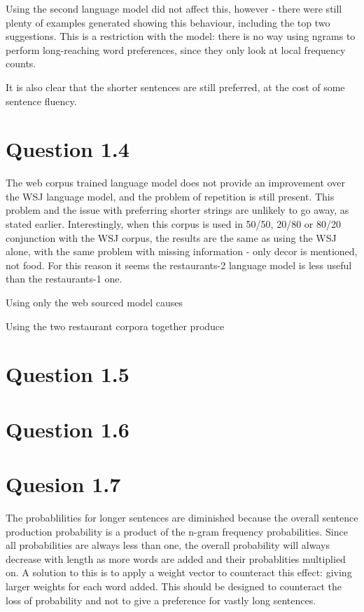 \documentclass[a4paper,11pt,oneside]{article}
\begin{document}
Using the second language model did not affect this, however - there were still plenty of examples generated showing this behaviour, including the top two suggestions. This is a restriction with the model: there is no way using ngrams to perform long-reaching word preferences, since they only look at local frequency counts.

It is also clear that the shorter sentences are still preferred, at the cost of some sentence fluency.

\section{Question 1.4}
The web corpus trained language model does not provide an improvement over the WSJ language model, and the problem of repetition is still present. This problem and the issue with preferring shorter strings are unlikely to go away, as stated earlier. Interestingly, when this corpus is used in 50/50, 20/80 or 80/20 conjunction with the WSJ corpus, the results are the same as using the WSJ alone, with the same problem with missing information - only decor is mentioned, not food. For this reason it seems the restaurants-2 language model is less useful than the restaurants-1 one.

Using only the web sourced model causes

Using the two restaurant corpora together produce 

\section{Question 1.5}

\section{Question 1.6}

\section{Quesion 1.7}
The probablilities for longer sentences are diminished because the overall sentence production probability is a product of the n-gram frequency probabilities. Since all probabilities are always less than one, the overall probability will always decrease with length as more words are added and their probablities multiplied on. A solution to this is to apply a weight vector to counteract this effect: giving larger weights for each word added. This should be designed to counteract the loss of probability and not to give a preference for vastly long sentences.
\end{document}
